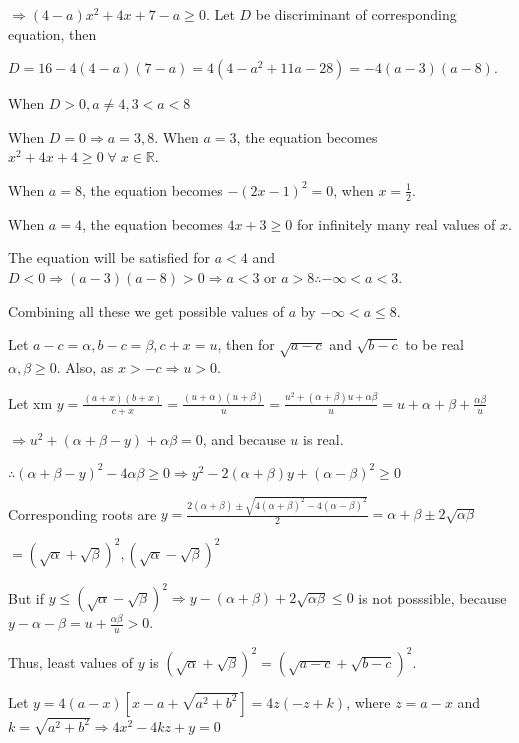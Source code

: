   $\Rightarrow (4 - a)x^2 + 4x + 7 - a\geq 0$. Let $D$ be discriminant of corresponding equation, then

  $D = 16 - 4(4 - a)(7 - a) = 4(4 - a^2 + 11a - 28) = -4(a - 3)(a - 8)$.

  When $D > 0, a\neq 4, 3 < a < 8$

  When $D= 0\Rightarrow a = 3, 8$. When $a = 3$, the equation becomes $x^2+ 4x + 4\geq
  0\;\forall\;x\in\mathbb{R}$.

  When $a = 8$, the equation becomes $-(2x - 1)^2 = 0$, when $x = \frac{1}{2}$.

  When $a = 4$, the equation becomes $4x + 3\geq 0$ for infinitely many real values of $x$.

  The equation will be satisfied for $a < 4$ and $D < 0 \Rightarrow (a - 3)(a - 8) > 0\Rightarrow a < 3$ or
  $a > 8 \therefore -\infty < a < 3$.

  Combining all these we get possible values of $a$ by $-\infty < a \leq 8$.
\item Let $a - c = \alpha, b - c = \beta, c + x = u$, then for $\sqrt{a - c}$ and $\sqrt{b - c}$ to be real
  $\alpha,\beta\geq 0$. Also, as $x > -c\Rightarrow u > 0$.

  Let xm
  $y = \frac{(a + x)(b + x)}{c + x} = \frac{(u + \alpha)(u + \beta)}{u} = \frac{u^2 + (\alpha + \beta)u +
    \alpha\beta}{u} = u + \alpha + \beta + \frac{\alpha\beta}{u}$

  $\Rightarrow u^2 + (\alpha + \beta - y) + \alpha\beta = 0$, and because $u$ is real.

  $\therefore (\alpha + \beta - y)^2 - 4\alpha\beta \geq 0 \Rightarrow y^2 - 2(\alpha + \beta)y + (\alpha -
  \beta)^2\geq 0$

  Corresponding roots are $y = \frac{2(\alpha + \beta)\pm\sqrt{4(\alpha + \beta)^2 - 4(\alpha -
      \beta)^2}}{2} = \alpha + \beta \pm2\sqrt{\alpha\beta}$

  $= (\sqrt{\alpha} + \sqrt{\beta})^2, (\sqrt{\alpha} - \sqrt{\beta})^2$

  But if $y \leq (\sqrt{\alpha} - \sqrt{\beta})^2 \Rightarrow y - (\alpha + \beta) + 2\sqrt{\alpha\beta}
  \leq 0$ is not posssible, because $y - \alpha - \beta = u + \frac{\alpha\beta}{u} > 0$.

  Thus, least values of $y$ is $(\sqrt{\alpha} + \sqrt{\beta})^2 = (\sqrt{a - c} + \sqrt{b - c})^2$.
\item Let $y = 4(a - x)[x - a + \sqrt{a^2 + b^2}] = 4z(-z + k)$, where $z = a - x$ and $k = \sqrt{a^2 +
  b^2}\Rightarrow 4x^2 - 4kz + y = 0$

